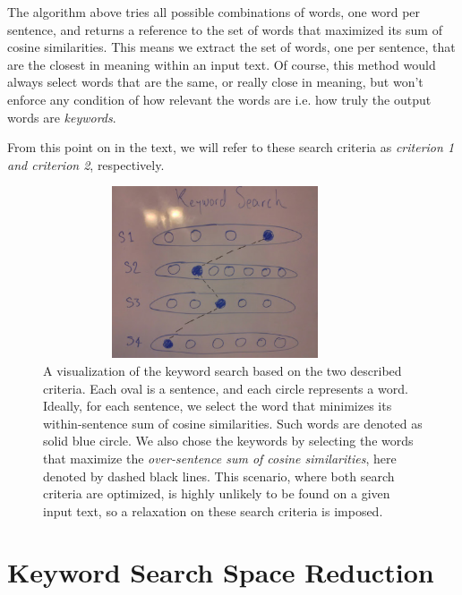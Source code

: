 \documentclass[12pt]{article}
\begin{document}
The algorithm above tries all possible combinations of words, one word per sentence, and returns a reference to the set of words that maximized its sum of cosine similarities. This means we extract the set of words, one per sentence,  that are the closest in meaning within an input text. Of course, this method would always select words that are the same, or really close in meaning, but won't enforce any condition of how relevant the words are i.e. how truly the output words are \textit{keywords}.


From this point on in the text, we will refer to these search criteria as \textit{criterion 1 and criterion 2}, respectively.



\begin{figure}[H]
\centering
\includegraphics[height=2in, width=4in]{Images/KeywordSearch.png}
\caption{A visualization of the keyword search based on the two described criteria. Each oval is a sentence, and each circle represents a word. Ideally, for each sentence, we select the word that minimizes its within-sentence sum of cosine similarities. Such words are denoted as solid blue circle. We also chose the keywords by selecting the words that maximize the \textit{over-sentence sum of cosine similarities}, here denoted by dashed black lines. This scenario, where both search criteria are optimized, is highly unlikely to be found on a given input text, so a relaxation on these search criteria is imposed.}
\end{figure}

\section{Keyword Search Space Reduction}
\end{document}
